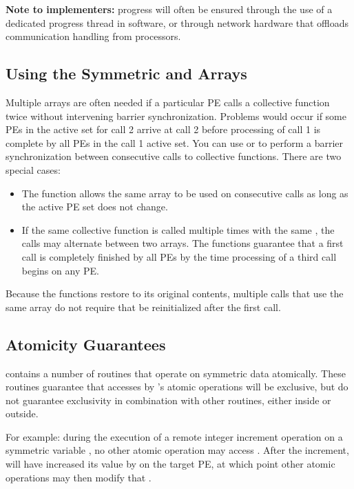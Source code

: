 \textbf{Note to implementers:} progress will often be ensured through
the use of a dedicated progress thread in software, or through
network hardware that offloads communication handling from processors.

\subsection{Using the Symmetric  and  Arrays}

Multiple  arrays are often needed if a particular \ac{PE} calls a \openshmem
collective  function twice without intervening barrier synchronization.
Problems would occur if some \ac{PE}s in the active set for call 2 arrive at
call 2 before processing of call 1 is complete by all \ac{PE}s in the call 1
active set.  You can use    or    to
perform  a  barrier  synchronization between consecutive calls to \openshmem
collective functions. There are two special cases:
\begin{itemize}
\item The  function allows the same  array to be used
          on consecutive calls as long as the active \ac{PE} set does not change.
\item  If the same collective function is called multiple times with the
          same \activeset, the calls may alternate between two  arrays.
          The \openshmem functions guarantee that a first call is completely finished by 
          all \ac{PE}s by the time processing of a third  call  begins  on
          any \ac{PE}.          
\end{itemize}
Because  the \openshmem functions restore  to its original contents,
multiple calls that use the same  array do not require that 
be reinitialized after the first call.

\subsection{Atomicity Guarantees}

\openshmem contains a number of routines that operate on symmetric data
atomically.  These routines guarantee that accesses by \openshmem's
atomic operations will be exclusive, but do not guarantee exclusivity
in combination with other routines, either inside \openshmem or
outside.

For example: during the execution of a remote integer increment
operation on a symmetric variable , no other \openshmem atomic
operation may access .  After the increment,  will have
increased its value by  on the target \ac{PE}, at which point other
atomic operations may then modify that .

